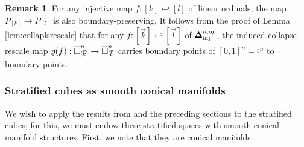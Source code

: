 \documentclass[10pt, reqno, twoside
, final
]{amsart}
\numberwithin{equation}{subsection}%
\theoremstyle{definition}
\theoremstyle{definition}
\theoremstyle{definition}
\theoremstyle{definition}
\theoremstyle{definition}
\theoremstyle{definition}
\theoremstyle{definition}
\theoremstyle{definition}
\theoremstyle{definition}
\theoremstyle{plain}
\theoremstyle{definition}
\theoremstyle{plain}
\theoremstyle{definition}
\theoremstyle{plain}
\theoremstyle{definition}
\newtheorem{rmk}[defn]{Remark}
\theoremstyle{definition}
\theoremstyle{plain}
\theoremstyle{plain}
\theoremstyle{definition}
\theoremstyle{plain}
\theoremstyle{plain}
\theoremstyle{plain}
\begin{document}
\begin{rmk}\label{rmk:bdypoints}
For any injective map $f:[k]\hookleftarrow [l]$ of linear ordinals, the map $\overline{P}_{[k]}\rightarrow \overline{P}_{[l]}$ is also boundary-preserving. It follows from the proof of Lemma \ref{lem:collaplsrescale} that for any $f:[\vec{k}]\hookleftarrow[\vec{l}]$ of $\boldsymbol{\Delta}^{n,op}_{\mathrm{inj}}$, the induced collapse-rescale map $\varrho(f):\overline{\square}^n_{[\vec{k}]}\rightarrow \overline{\square}^n_{[\vec{l}]}$ carries boundary points of $[0,1]^n=\overline{\square}^n$ to boundary points.
\end{rmk}

\subsubsection{Stratified cubes as smooth conical manifolds}

We wish to apply the results from \cite{KS} and the preceding sections to the stratified cubes; for this, we must endow these stratified spaces with smooth conical manifold structures. First, we note that they are conical manifolds.
\end{document}
